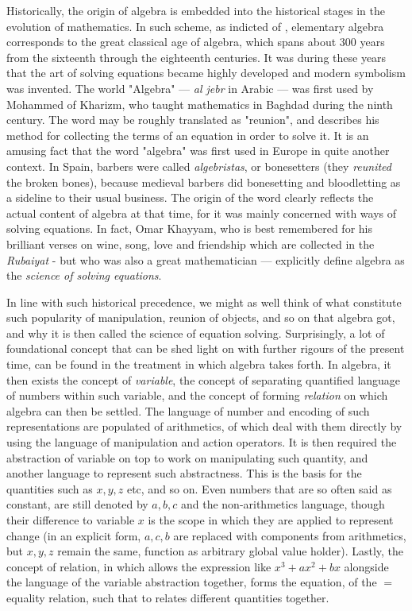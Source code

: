 Historically, the origin of algebra is embedded into the historical stages in the evolution of mathematics. In such scheme, as indicted of \cite{Pinter2019ABO}, elementary algebra corresponds to the great classical age of algebra, which spans about 300 years from the sixteenth through the eighteenth centuries. It was during these years that the art of solving equations became highly developed and modern symbolism was invented. The world "Algebra" --- \textit{al jebr} in Arabic --- was first used by Mohammed of Kharizm, who taught mathematics in Baghdad during the ninth century. The word may be roughly translated as "reunion", and describes his method for collecting the terms of an equation in order to solve it. It is an amusing fact that the word "algebra" was first used in Europe in quite another context. In Spain, barbers were called \textit{algebristas}, or bonesetters (they \textit{reunited} the broken bones), because medieval barbers did bonesetting and bloodletting as a sideline to their usual business. The origin of the word clearly reflects the actual content of algebra at that time, for it was mainly concerned with ways of solving equations. In fact, Omar Khayyam, who is best remembered for his brilliant verses on wine, song, love and friendship which are collected in the \textit{Rubaiyat} - but who was also a great mathematician --- explicitly define algebra as the \textit{science of solving equations}. 

In line with such historical precedence, we might as well think of what constitute such popularity of manipulation, reunion of objects, and so on that algebra got, and why it is then called the science of equation solving. Surprisingly, a lot of foundational concept that can be shed light on with further rigours of the present time, can be found in the treatment in which algebra takes forth. In algebra, it then exists the concept of \textit{variable}, the concept of separating quantified language of numbers within such variable, and the concept of forming \textit{relation} on which algebra can then be settled. The language of number and encoding of such representations are populated of arithmetics, of which deal with them directly by using the language of manipulation and action operators. It is then required the abstraction of variable on top to work on manipulating such quantity, and another language to represent such abstractness. This is the basis for the quantities such as $x,y,z$ etc, and so on. Even numbers that are so often said as constant, are still denoted by $a,b,c$ and the non-arithmetics language, though their difference to variable $x$ is the scope in which they are applied to represent change (in an explicit form, $a,c,b$ are replaced with components from arithmetics, but $x,y,z$ remain the same, function as arbitrary global value holder). Lastly, the concept of relation, in which allows the expression like $x^{3}+ax^{2}+bx$ alongside the language of the variable abstraction together, forms the equation, of the $=$ equality relation, such that to relates different quantities together.

